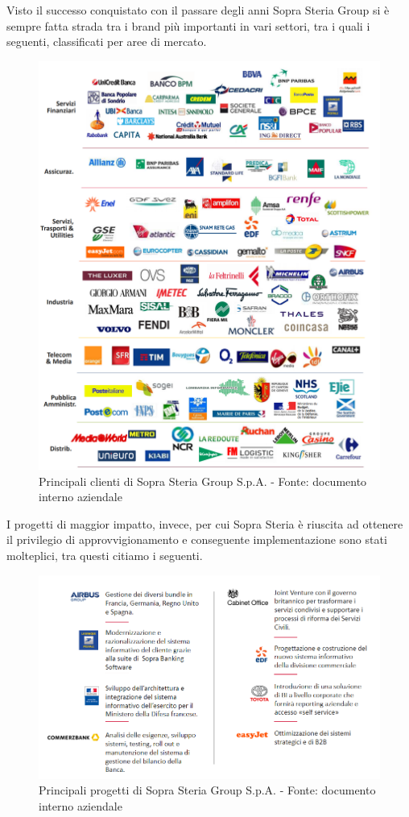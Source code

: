	Visto il successo conquistato con il passare degli anni Sopra Steria Group si è sempre fatta strada tra i brand più importanti in vari settori, tra i quali i seguenti, classificati per aree di mercato.
	\begin{figure}[H]
	\centering
   	\includegraphics[width=1\textwidth]{immagini/principali_referenze}
   	\caption{Principali clienti di Sopra Steria Group S.p.A. - Fonte: documento interno aziendale}
	\end{figure}
\newpage
	I progetti di maggior impatto, invece, per cui Sopra Steria è riuscita ad ottenere il privilegio di approvvigionamento e conseguente implementazione sono stati molteplici, tra questi citiamo i seguenti.
	\begin{figure}[H]
	\centering
   	\includegraphics[width=1\textwidth]{immagini/Progetti_Importanti}
   	\caption{Principali progetti di Sopra Steria Group S.p.A. - Fonte: documento interno aziendale}
	\end{figure}
	 

